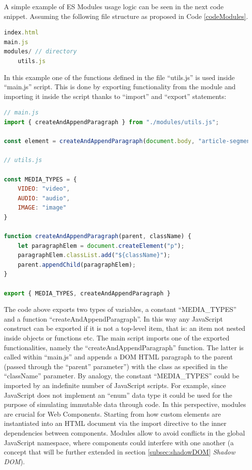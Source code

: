 A simple example of ES Modules usage logic can be seen in the next code snippet. Assuming the following file structure as proposed in Code \ref{codeModules}.
\\
\begin{lstlisting}[caption={File structure with a module},label={codeModules}, language=JavaScript]
index.html
main.js
modules/ // directory
    utils.js
\end{lstlisting}

In this example one of the functions defined in the file “utils.js” is used inside “main.js” script. This is done by exporting functionality from the module and importing it inside the script thanks to “import” and “export” statements:
\\
\begin{lstlisting}[caption={Import, export directives},label={codeImportExport}, language=JavaScript]
// main.js
import { createAndAppendParagraph } from "./modules/utils.js";

const element = createAndAppendParagraph(document.body, "article-segment");

// utils.js

const MEDIA_TYPES = {
    VIDEO: "video",
    AUDIO: "audio",
    IMAGE: "image"
}

function createAndAppendParagraph(parent, className) {
    let paragraphElem = document.createElement("p");
    paragraphElem.classList.add("${className}");
    parent.appendChild(paragraphElem);
}

export { MEDIA_TYPES, createAndAppendParagraph }
\end{lstlisting}

The code above exports two types of variables, a constant “MEDIA\_TYPES” and a function “createAndAppendParagraph”. In this way any JavaScript construct can be exported if it is not a top-level item, that is: an item not nested inside objects or functions etc. The main script imports one of the exported functionalities, namely the “createAndAppendParagraph” function. The latter is called within “main.js” and appends a DOM HTML paragraph to the parent (passed through the “parent” parameter”) with the class as specified in the “className” parameter. By analogy, the constant “MEDIA\_TYPES” could be imported by an indefinite number of JavaScript scripts. For example, since JavaScript does not implement an “enum” data type it could be used for the purpose of simulating immutable data through code.
In this perspective, modules are crucial for Web Components. Starting from how custom elements are instantiated into an HTML document via the import directive to the inner dependencies between components. Modules allow to avoid conflicts in the global JavaScript namespace, where components could interfere with one another (a concept that will be further extended in section \ref{subsec:shadowDOM} \emph{Shadow DOM}).

